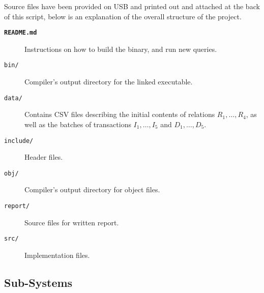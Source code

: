 Source files have been provided on USB and printed out and attached at the back of this script, below is an explanation of the overall structure of the project.

\begin{description}
  \item[\textnormal{\textbf{\texttt{README.md}}}] Instructions on how to build the binary, and run new queries.
  \item[\textnormal{\texttt{bin/}}] Compiler's output directory for the linked executable.
  \item[\textnormal{\texttt{data/}}] Contains CSV files describing the initial contents of relations $R_1,\ldots,R_4$, as well as the batches of transactions $I_1,\ldots,I_5$ and $D_1,\ldots,D_5$.
  \item[\textnormal{\texttt{include/}}] Header files.
  \item[\textnormal{\texttt{obj/}}] Compiler's output directory for object files.
  \item[\textnormal{\texttt{report/}}] Source files for written report.
  \item[\textnormal{\texttt{src/}}] Implementation files.
\end{description}

\subsection{Sub-Systems}\label{sec:q-2-class}

